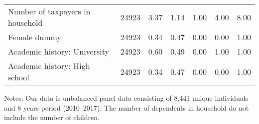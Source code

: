 \begin{table}
\begin{threeparttable}
\begin{tabular}[t]{lcccccc}
\hspace{1em}Number of taxpayers in household & 24923 & \num{3.37} & \num{1.14} & \num{1.00} & \num{4.00} & \num{8.00}\\
\hspace{1em}Female dummy & 24923 & \num{0.34} & \num{0.47} & \num{0.00} & \num{0.00} & \num{1.00}\\
\hspace{1em}Academic history: University & 24923 & \num{0.60} & \num{0.49} & \num{0.00} & \num{1.00} & \num{1.00}\\
\hspace{1em}Academic history: High school & 24923 & \num{0.34} & \num{0.47} & \num{0.00} & \num{0.00} & \num{1.00}\\
\bottomrule
\end{tabular}
\begin{tablenotes}
\item Notes: Our data is unbalanced panel data consisting of 8,441 unique individuals and 8 years period (2010--2017). The number of dependents in household do not include the number of children.
\end{tablenotes}
\end{threeparttable}
\end{table}
